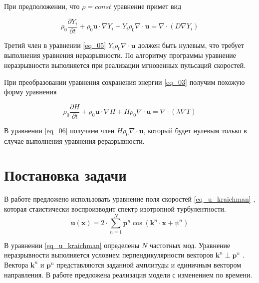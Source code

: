 \documentclass[12pt,a4paper]{article}
\begin{document}
При предположении, что $\rho = const$ уравнение примет вид

\begin{equation}\label{eq_05}
\rho_0 \frac{\partial Y_i}{\partial t} + 
\rho_0 \boldsymbol{u}\cdot \nabla Y_i  + 
Y_i \rho_0 \nabla\cdot \boldsymbol{u} = 
 	\nabla \cdot \left( D \nabla Y_i \right)
\end{equation}


Третий член в уравнении \eqref{eq_05} $Y_i \rho_0 \nabla\cdot  \boldsymbol{u}$ должен быть нулевым, что требует выполнения уравнения неразрывности. По алгоритму программы  уравнение неразрывности выполняется при реализации мгновенных пульсаций скоростей.

При преобразовании уравнения сохранения энергии \eqref{eq_03} получим  похожую форму уравнения

\begin{equation}\label{eq_06}
\rho_0 \frac{\partial H}{\partial t} + 
\rho_0 \boldsymbol{u}\cdot \nabla H  + 
H  \rho_0 \nabla\cdot \boldsymbol{u} = 
\nabla \cdot \left( \lambda \nabla T \right)
\end{equation}

В уравнении \eqref{eq_06} получаем член $H  \rho_0 \nabla\cdot \boldsymbol{u}$, который будет нулевым только в случае выполнения уравнения реразрывности. 

%
%
\section{Постановка задачи}

В работе \cite{kraichnan_diffusion_1970} предложено использовать уравнение поля скоростей \ref{eq_u_kraichman} , которая стаистически воспроизводит спектр изотропной турбулентности. 
\begin{equation} \label{eq_u_kraichman}
\boldsymbol{u}(\boldsymbol{x}) = 2 \cdot \sum_{n=1}^{N} \boldsymbol{p}^{n} \cos \left(\boldsymbol{k}^n\cdot \boldsymbol{x}+\psi^n\right)
\end{equation}

В уравнении \ref{eq_u_kraichman} определены $N$ частотных мод. Уравнение неразрывности выполняется условием перпендикулярности векторов $\boldsymbol{k}^n \perp \boldsymbol{p}^n $ . Вектора $\boldsymbol{k}^n$ и $\boldsymbol{p}^n$ представляются заданной амплитуды и единичным вектором направления. В работе предложена реализация  модели с изменением по времени.
\end{document}

